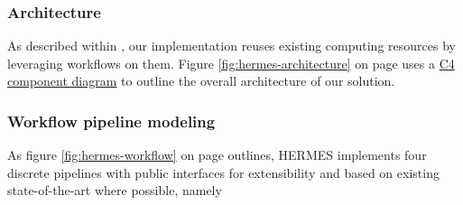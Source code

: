 \documentclass[11pt,a4paper]{scrartcl}
\begin{document}
\subsubsection{Architecture}\label{subsubsec:concept-implementation-architecture}
As described within , our implementation reuses existing computing resources by leveraging workflows
on them. Figure \ref{fig:hermes-architecture} on page \pageref{fig:hermes-architecture} uses a \href{https://c4model.com/#ComponentDiagram}{C4 component diagram}
to outline the overall architecture of our solution.

\subsubsection{Workflow pipeline modeling}\label{subsubsec:concept-implementation-workflow}
As figure \ref{fig:hermes-workflow} on page \pageref{fig:hermes-workflow} outlines, HERMES implements four discrete pipelines with
public interfaces for extensibility and based on existing state-of-the-art  where possible, namely
\end{document}
